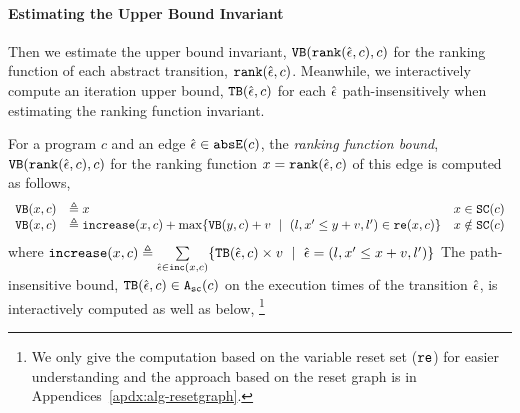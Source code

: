  \paragraph{Estimating the Upper Bound Invariant}
Then we estimate the upper bound invariant, ${\mathtt{VB}}(\mathtt{rank}(\hat{\mathtt{\epsilon}{}}, c), c)$ for the ranking function of each abstract transition, $\mathtt{rank}(\hat{\mathtt{\epsilon}{}}, c)$. Meanwhile, we interactively compute an iteration upper bound, ${\mathtt{TB}}(\hat{\mathtt{\epsilon}{}}, c)$ for each $\hat{\mathtt{\epsilon}{}}$ path-insensitively when estimating the ranking function invariant.
\begin{defn}
 \label{def:ranking_bound}
For a program $c$ and an edge $\hat{\mathtt{\epsilon}{}} \in \mathtt{abs}{\mathtt{E}}(c)$,
the \emph{ranking function bound}, 
${\mathtt{VB}}(\mathtt{rank}(\hat{\mathtt{\epsilon}{}}, c), c)$ for the ranking function $x = \mathtt{rank}(\hat{\mathtt{\epsilon}{}}, c)$
of this edge
is computed as follows,
{\small
 \[ 
\begin{array}{lll}
 \varinvar(x, c) & \triangleq x & x \in \scvar(c) \\
 \varinvar(x, c) & \triangleq \incrs(x, c) + \max\left\{\varinvar(y, c) + v ~\mid~ (l, x' \leq y + v, l') \in \reset(x, c) \right\} & x \notin \scvar(c)
\end{array}
\]
}
%
where $\mathtt{increase}(x, c) \triangleq \sum\limits_{\hat{\mathtt{\epsilon}{}} \in \mathtt{inc}(x, c)}\{{\mathtt{TB}}(\hat{\mathtt{\epsilon}{}}, c) \times v ~\mid~ \hat{\mathtt{\epsilon}{}} = (l, x' \leq x + v, l')\}$
The path-insensitive bound, ${\mathtt{TB}}(\hat{\mathtt{\epsilon}{}}, c) \in {\ensuremath{\mathtt{A_{sc}}}}(c)$ on the execution times of the transition $\hat{\mathtt{\epsilon}{}}$, is interactively computed as well as below,
\footnote{We only give the computation based on the variable reset set ($\mathtt{re}$) for easier understanding
and the approach based on the reset graph is in Appendices~\ref{apdx:alg-resetgraph}.
}
{\small
}
\end{defn}
